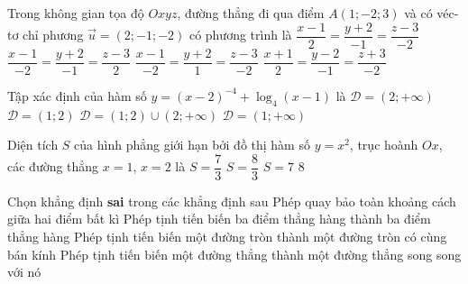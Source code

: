 \begin{ex}%
Trong không gian tọa độ $Oxyz$, đường thẳng đi qua điểm $A\left(1; - 2; 3\right)$ và có véc-tơ chỉ phương $\overrightarrow{u} = \left(2; -1; - 2\right)$ có phương trình là
\choice
{\True $\dfrac{x - 1}{2} = \dfrac{y + 2}{- 1} = \dfrac{z - 3}{- 2}$}
{$\dfrac{x - 1}{- 2} = \dfrac{y + 2}{- 1} = \dfrac{z - 3}{2}$}
{$\dfrac{x - 1}{- 2} = \dfrac{y + 2}{1} = \dfrac{z - 3}{- 2}$}
{$\dfrac{x + 1}{2}=\dfrac{y - 2}{- 1} = \dfrac{z  + 3}{- 2}$}
\end{ex}
\begin{ex}%
Tập xác định của hàm số $y = \left(x - 2\right)^{- 4} + \log_{4}\left(x - 1\right)$ là
	\choice
	{$\mathscr{D} = \left(2; +\infty\right)$}
	{$\mathscr{D} = \left(1; 2\right)$}
	{\True $\mathscr{D} = \left(1;2\right)\cup\left(2; +\infty\right)$}
	{$\mathscr{D} = \left(1; +\infty\right)$}
\end{ex}
\begin{ex}%
Diện tích $S$ của hình phẳng giới hạn bởi đồ thị hàm số $y = x^2$, trục hoành $Ox$, các đường thẳng $x = 1$, $x = 2$ là
\choice
	{\True $S  =  \dfrac{7}{3}$}
	{$S  =  \dfrac{8}{3}$}
	{$S  =   7$}
	{$8$}
\end{ex}
\begin{ex}%
Chọn khẳng định {\bf{sai}} trong các khẳng định sau
	\choice
	{Phép quay bảo toàn khoảng cách giữa hai điểm bất kì}
	{Phép tịnh tiến biến ba điểm thẳng hàng thành ba điểm thẳng hàng}
	{Phép tịnh tiến biến một đường tròn thành một đường tròn có cùng bán kính}
	{\True Phép tịnh tiến biến một đường thẳng thành một đường thẳng song song với nó}
\end{ex}
